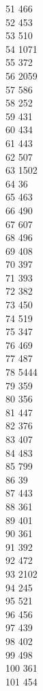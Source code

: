 { 51	466 \\
 52	453 \\
 53	510 \\
 54	1071 \\
 55	372 \\
 56	2059 \\
 57	586 \\
 58	252 \\
 59	431 \\
 60	434 \\
 61	443 \\
 62	507 \\
 63	1502 \\
 64	36 \\
 65	463 \\
 66	490 \\
 67	607 \\
 68	496 \\
 69	408 \\
 70	397 \\
 71	393 \\
 72	382 \\
 73	450 \\
 74	519 \\
 75	347 \\
 76	469 \\
 77	487 \\
 78	5444 \\
 79	359 \\
 80	356 \\
 81	447 \\
 82	376 \\
 83	407 \\
 84	483 \\
 85	799 \\
 86	39 \\
 87	443 \\
 88	361 \\
 89	401 \\
 90	361 \\
 91	392 \\
 92	472 \\
 93	2102 \\
 94	245 \\
 95	521 \\
 96	456 \\
 97	439 \\
 98	402 \\
 99	498 \\
 100	361 \\
 101	454 \\
}
